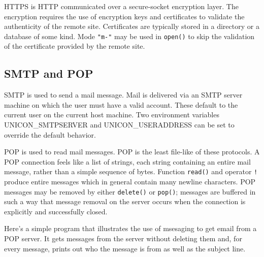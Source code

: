 HTTPS is HTTP communicated over a secure-socket
encryption layer. The encryption requires the use of encryption keys
and certificates to validate the authenticity of the remote site.
Certificates are typically stored in a directory or a
database of some kind. Mode \texttt{"m-"} may be used in
\texttt{open()} to skip the validation of the certificate provided
by the remote site.

\subsection*{SMTP and POP}

SMTP is used to send a mail message. Mail is delivered via
an SMTP server machine on which the user must have a valid account.
These default to the current user on the current host machine. Two
environment variables UNICON\_SMTPSERVER and UNICON\_USERADDRESS can be
set to override the default behavior.

POP is used to read mail messages. POP is the least file-like
of these protocols. A POP connection feels like a list of strings, each
string containing an entire mail message, rather than a simple sequence
of bytes. Function \texttt{read()} and operator \texttt{!} produce
entire messages which in general contain many newline characters. POP
messages may be removed by either \texttt{delete()} or \texttt{pop()};
messages are buffered in such a way that message removal on the server
occurs when the connection is explicitly and successfully closed.

Here's a simple program that illustrates the use of
msesaging to get email from a POP server. It gets messages from the
server without deleting them and, for every message, prints out who the
message is from as well as the subject line.


